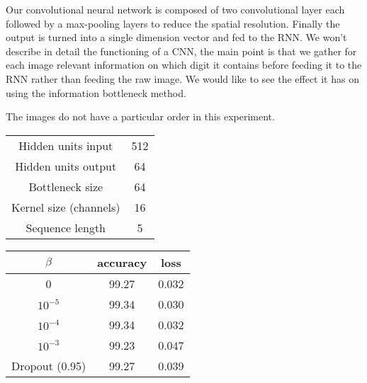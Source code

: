 \documentclass[11pt,oneside,openright]{report}
\begin{document}
Our convolutional neural network is composed of two convolutional layer each followed by a max-pooling layers to reduce the spatial resolution. Finally the output is turned into a single dimension vector and fed to the RNN. We won't describe in detail the functioning of a CNN, the main point is that we gather for each image relevant information on which digit it contains before feeding it to the RNN rather than feeding the raw image. We would like to see the effect it has on using the information bottleneck method.

The images do not have a particular order in this experiment.

\begin{minipage}{0.5\textwidth}
        \centering
\begin{tabular}{ c | c  }
 Hidden units input & 512 \\
 Hidden units output & 64 \\
 Bottleneck size & 64 \\
 Kernel size (channels) & 16\\
 Sequence length & 5 \\
\end{tabular}
    \end{minipage}\hfill
    \begin{minipage}{0.5\textwidth}
        \centering
\begin{tabular}{ c | c c }
 $\beta$ & accuracy & loss \\
 \hline
0  &  99.27  & 0.032 \\
$10^{-5}$  & 99.34 & 0.030  \\
$10^{-4}$  & 99.34 & 0.032  \\
$10^{-3}$  & 99.23 & 0.047  \\
\hline
\hline
Dropout (0.95) & 99.27 & 0.039
\end{tabular}
    \end{minipage}

\begin{center}
\end{center}
\end{document}
